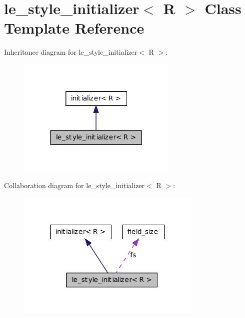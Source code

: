 \hypertarget{classle__style__initializer}{
\section{le\_\-style\_\-initializer$<$ R $>$ Class Template Reference}
\label{classle__style__initializer}
}


Inheritance diagram for le\_\-style\_\-initializer$<$ R $>$:
\nopagebreak
\begin{figure}[H]
\begin{center}
\leavevmode
\includegraphics[width=216pt]{classle__style__initializer__inherit__graph}
\end{center}
\end{figure}


Collaboration diagram for le\_\-style\_\-initializer$<$ R $>$:
\nopagebreak
\begin{figure}[H]
\begin{center}
\leavevmode
\includegraphics[width=250pt]{classle__style__initializer__coll__graph}
\end{center}
\end{figure}
